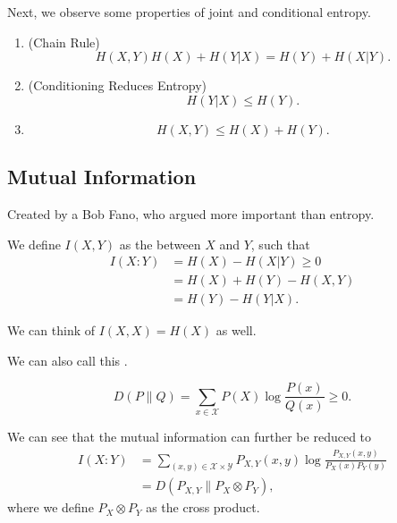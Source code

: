 \documentclass{article}
\begin{document}
Next, we observe some properties of joint and conditional entropy. 

\begin{proposition} 
	\begin{enumerate}
		\item (Chain Rule) \[H(X, Y)  H(X) + H(Y | X) = H(Y) + H(X | Y).\] 
		\item (Conditioning Reduces Entropy) \[H(Y | X) \leq H(Y).\]
		\item \[H(X, Y) \leq H(X) + H(Y).\] 
	\end{enumerate}
\end{proposition}

\subsection{Mutual Information}
Created by a Bob Fano, who argued more important than entropy.

\begin{definition}
	We define $I(X, Y)$ as the  between $X$ and $Y$, such that
	\begin{align*}
		I(X: Y) &= H(X) - H(X | Y) \geq 0 \\
				&= H(X) + H(Y) - H(X, Y) \\
				&= H(Y) - H(Y | X).
	\end{align*}
\end{definition}

We can think of $I(X, X) = H(X)$ as well.

\begin{definition} 
	We can also call this . 

	\[D(P \parallel Q) = \sum_{x \in \mathcal{X}} P(X) \log \frac{P(x)}{Q(x)} \geq 0.\]
\end{definition}

We can see that the mutual information can further be reduced to 
\begin{align*}
	I(X : Y) &= \sum_{(x, y) \in \mathcal{X} \times \mathcal{Y}} P_{X, Y}(x, y) \log \frac{P_{X, Y}(x, y)}{P_X(x)P_Y(y)} \\
			 &= D(P_{X, Y} \parallel P_X \otimes P_Y),
\end{align*}
where we define $P_X \otimes P_Y$ as the cross product. 
\end{document}
